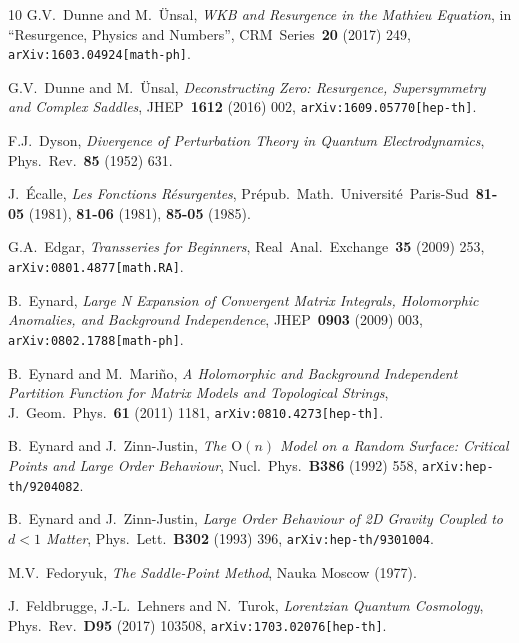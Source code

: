 \documentclass[11pt,a4paper]{article}
\begin{document}
\begin{thebibliography}{10}
G.V.~Dunne and M.~\"Unsal,
\textit{WKB and Resurgence in the Mathieu Equation},
in ``Resurgence, Physics and Numbers'', CRM\ Series\ \textbf{20} (2017) 249,
\texttt{arXiv:1603.04924[math-ph]}.

G.V.~Dunne and M.~\"Unsal,
\textit{Deconstructing Zero: Resurgence, Supersymmetry and Complex Saddles},
JHEP\ \textbf{1612} (2016) 002,
\texttt{arXiv:1609.05770[hep-th]}.

F.J.~Dyson,
\textit{Divergence of Perturbation Theory in Quantum Electrodynamics},
Phys.\ Rev.\ \textbf{85} (1952) 631.

J.~\'Ecalle,
\textit{Les Fonctions R\'esurgentes},
Pr\'epub.\ Math.\ Universit\'e\ Paris-Sud\ \textbf{81-05} (1981), \textbf{81-06} (1981), \textbf{85-05} (1985).

G.A.~Edgar,
\textit{Transseries for Beginners},
Real\ Anal.\ Exchange\ \textbf{35} (2009) 253,
\texttt{arXiv:0801.4877[math.RA]}.

B.~Eynard,
\textit{Large N Expansion of Convergent Matrix Integrals, Holomorphic Anomalies, and Background Independence},
JHEP\ \textbf{0903} (2009) 003,
\texttt{arXiv:0802.1788[math-ph]}.

B.~Eynard and M.~Mari\~no,
\textit{A Holomorphic and Background Independent Partition Function for Matrix Models and Topological Strings},
J.\ Geom.\ Phys.\ \textbf{61} (2011) 1181,
\texttt{arXiv:0810.4273[hep-th]}.

B.~Eynard and J.~Zinn-Justin,
\textit{The $\text{O}(n)$ Model on a Random Surface: Critical Points and Large Order Behaviour},
Nucl.\ Phys.\ \textbf{B386} (1992) 558,
\texttt{arXiv:hep-th/9204082}.

B.~Eynard and J.~Zinn-Justin,
\textit{Large Order Behaviour of 2D Gravity Coupled to $d<1$ Matter},
Phys.\ Lett.\ \textbf{B302} (1993) 396,
\texttt{arXiv:hep-th/9301004}.

M.V.~Fedoryuk,
\textit{The Saddle-Point Method},
Nauka Moscow (1977).

J.~Feldbrugge, J.-L.~Lehners and N.~Turok,
\textit{Lorentzian Quantum Cosmology},
Phys.\ Rev.\ \textbf{D95} (2017) 103508,
\texttt{arXiv:1703.02076[hep-th]}.


\end{thebibliography}
\end{document}
